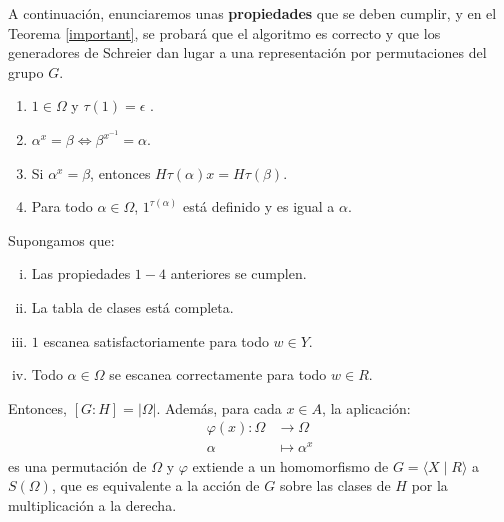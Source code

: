 \newpage
A continuación, enunciaremos unas \textbf{propiedades} que se deben cumplir, y en el Teorema \ref{important}, se probará que el algoritmo es correcto y que los generadores de Schreier dan lugar a una representación por permutaciones del grupo $G$.

    \begin{enumerate}
        \item $1 \in \Omega$ y $\tau(1)=\epsilon$ .
        \item $\alpha^x=\beta \Longleftrightarrow \beta^{x^{-1}}=\alpha$.
        \item Si $\alpha^x=\beta$, entonces $H\tau(\alpha)x=H\tau(\beta)$.
        \item Para todo $\alpha \in \Omega$, $1^{\tau(\alpha)}$ está definido y es igual a $\alpha$.
    \end{enumerate}

        \begin{theorem} \label{important}
        Supongamos que:
            
        \renewcommand{\theenumi}{}
        \begin{enumerate}[(i)]
            \item Las propiedades $1-4$ anteriores se cumplen. \label{uno}
            \item La tabla de clases está completa.
            \item $1$ escanea satisfactoriamente para todo $w\in Y$.
            \item Todo $\alpha \in \Omega$ se escanea correctamente para todo $w \in R$.
        \end{enumerate}
        Entonces, $[G:H] = |\Omega|$. Además, para cada $x \in A$, la aplicación:
        \begin{align*}
            \varphi(x) \colon \Omega &\to \Omega \\
            \alpha & \mapsto \alpha^x
        \end{align*}
        es una permutación de $\Omega$ y $\varphi$ extiende a un homomorfismo de $G=\langle X \mid R \rangle$ a $S(\Omega)$, que es equivalente a la acción de $G$ sobre las clases de $H$ por la multiplicación a la derecha.
        \end{theorem}
        
